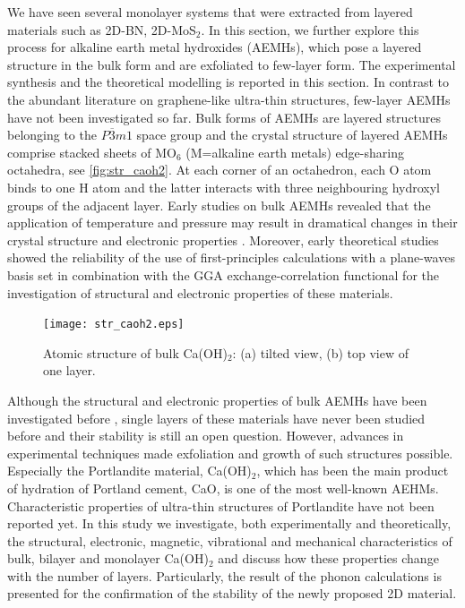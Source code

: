 We have seen several monolayer systems that were extracted from layered materials such as 2D-BN, 2D-MoS$_2$. In this section, we further explore this process for alkaline earth metal hydroxides (AEMHs), which pose a layered structure in the bulk form and are exfoliated to few-layer form. The experimental synthesis and the theoretical modelling is reported in this section. In contrast to the abundant literature on graphene-like ultra-thin structures, few-layer AEMHs have not been investigated so far. Bulk forms of AEMHs are layered structures belonging to the $P\overline{3}m1$ space group\cite{structure1} and the crystal structure of layered AEMHs comprise stacked sheets of MO$_6$ (M=alkaline earth metals) edge-sharing octahedra, see \autoref{fig:str_caoh2}. At each corner of an octahedron, each O atom binds to one H atom and the latter interacts with three neighbouring hydroxyl groups of the adjacent layer. Early studies on bulk AEMHs revealed that the application of temperature and pressure may result in dramatical changes in their crystal structure and electronic properties\cite{amorphization1,amorphization2,amorphization3,amorphization4,transition1,transition2,transition3,transition4} . Moreover, early theoretical studies showed the reliability of the use of first-principles calculations with a plane-waves basis set in combination with the GGA exchange-correlation functional for the investigation of structural and electronic properties of these materials\cite{Winkler1995,Baranek2001,Azuma2011,DArco1993}.

\begin{figure}[htb]
\centering
\texttt{[image: str\_caoh2.eps]}
\caption{\label{fig:str_caoh2} Atomic structure of bulk Ca(OH)$_2$: (a)
tilted view, (b) top view of one layer. }
\end{figure}

Although the structural and electronic properties of bulk AEMHs have been
investigated before \cite{Azuma2011,Pishtshev,Pishtshev1} , single layers of 
these materials have never been studied before and their stability is 
still an open question. However, advances 
in experimental techniques made exfoliation and growth of such 
structures possible\cite{new1,new2}. Especially the Portlandite material, Ca(OH)$_2$,
which has been the 
main product of hydration of Portland cement, CaO, is one of the most well-known 
AEHMs. Characteristic properties of ultra-thin structures of Portlandite have 
not been reported yet. In this study we investigate, both experimentally and theoretically, 
the structural, electronic, magnetic, vibrational and mechanical 
characteristics of bulk, bilayer and monolayer Ca(OH)$_{2}$ and discuss how these properties change with the number of layers.  Particularly, the result of the phonon calculations is presented for the confirmation of the stability of the newly proposed 2D material.

